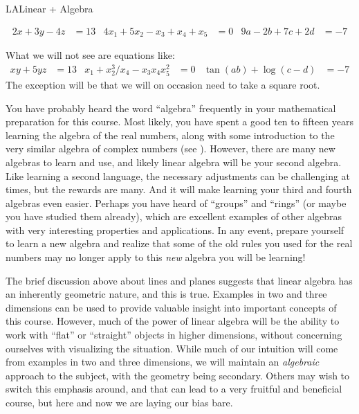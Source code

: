 \begin{subsect}{LA}{Linear + Algebra}
\begin{para}
\begin{align*}
2x+3y-4z&=13
&
4x_1+5x_2-x_3+x_4+x_5&=0
&
9a-2b+7c+2d&=-7
\end{align*}\end{para}
%
\begin{para}What we will not see are equations like:
%
\begin{align*}
xy + 5yz&=13
&
x_1 + x_2^3/x_4 - x_3x_4x_5^2&=0
&
\tan(ab)+\log(c-d)&=-7
\end{align*}
%
The exception will be that we will on occasion need to take a square root.\end{para}
%
\begin{para}You have probably heard the word ``algebra'' frequently in your mathematical preparation for this course.  Most likely, you have spent a good ten to fifteen years learning the algebra of the real numbers, along with some introduction to the very similar algebra of complex numbers (see ).  However, there are many new algebras to learn and use, and likely linear algebra will be your second algebra.  Like learning a second language, the necessary adjustments can be challenging at times, but the rewards are many.  And it will make learning your third and fourth algebras even easier.  Perhaps you have heard of ``groups'' and ``rings'' (or maybe you have studied them already), which are excellent examples of other algebras with very interesting properties and applications.  In any event, prepare yourself to learn a new algebra and realize that some of the old rules you used for the real numbers may no longer apply to this {\em new} algebra you will be learning!\end{para}
%
\begin{para}The brief discussion above about lines and planes suggests that linear algebra has an inherently geometric nature, and this is true.  Examples in two and three dimensions can be used to provide valuable insight into important concepts of this course.  However, much of the power of linear algebra will be the ability to work with ``flat'' or ``straight'' objects in higher dimensions, without concerning ourselves with visualizing the situation.  While much of our intuition will come from examples in two and three dimensions, we will maintain an {\em algebraic} approach to the subject, with the geometry being secondary.  Others may wish to switch this emphasis around, and that can lead to a very fruitful and beneficial course, but here and now we are laying our bias bare.\end{para}
%
\end{subsect}
